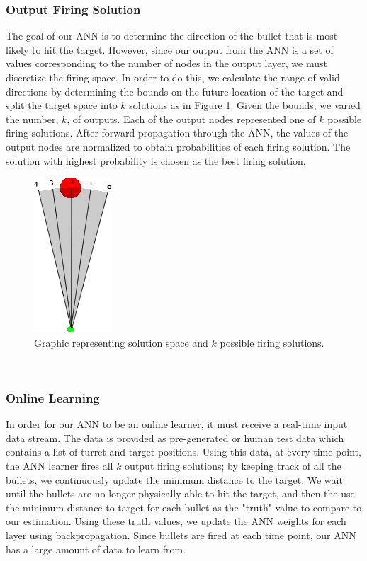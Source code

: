 \documentclass[11pt,letterpaper]{article}
\begin{document}
\subsubsection{Output Firing Solution}
The goal of our ANN is to determine the direction of the bullet that is most likely to hit the target. However, since our output from the ANN is a set of values corresponding to the number of nodes in the output layer, we must discretize the firing space. In order to do this, we calculate the range of valid directions by determining the bounds on the future location of the target and split the target space into $k$ solutions as in Figure \ref{fig:firing_soln}. Given the bounds, we varied the number, $k$, of outputs. Each of the output nodes represented one of $k$ possible firing solutions. After forward propagation through the ANN, the values of the output nodes are normalized to obtain probabilities of each firing solution. The solution with highest probability is chosen as the best firing solution.
\begin{figure}[h]
	\centering
	\includegraphics[scale = 0.8]{firing_arc_graphic.png}
	\caption{Graphic representing solution space and $k$ possible firing solutions.}
	\label{fig:firing_soln}
\end{figure}\\

\subsubsection{Online Learning}
In order for our ANN to be an online learner, it must receive a real-time input data stream. The data is provided as pre-generated or human test data which contains a list of turret and target positions. Using this data, at every time point, the ANN learner fires all $k$ output firing solutions; by keeping track of all the bullets, we continuously update the minimum distance to the target. We wait until the bullets are no longer physically able to hit the target, and then the use the minimum distance to target for each bullet as the "truth" value to compare to our estimation. Using these truth values, we update the ANN weights for each layer using backpropagation. Since bullets are fired at each time point, our ANN has a large amount of data to learn from.
\end{document}
